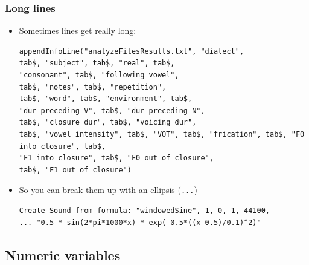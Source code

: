 \documentclass[handout]{beamer}
\begin{document}
\begin{frame}[fragile]
\frametitle{Long lines}
\begin{itemize}
    \item <1-> Sometimes lines get really long:
    \begin{verbatim}appendInfoLine("analyzeFilesResults.txt", "dialect",
tab$, "subject", tab$, "real", tab$,
"consonant", tab$, "following vowel",
tab$, "notes", tab$, "repetition",
tab$, "word", tab$, "environment", tab$,
"dur preceding V", tab$, "dur preceding N",
tab$, "closure dur", tab$, "voicing dur",
tab$, "vowel intensity", tab$, "VOT", tab$, "frication", tab$, "F0 into closure", tab$,
"F1 into closure", tab$, "F0 out of closure",
tab$, "F1 out of closure") 
    \end{verbatim}

    \item <2-> So you can break them up with an ellipsis (\texttt{...})
    \begin{verbatim}Create Sound from formula: "windowedSine", 1, 0, 1, 44100,
... "0.5 * sin(2*pi*1000*x) * exp(-0.5*((x-0.5)/0.1)^2)"
\end{verbatim}
\end{itemize}
\end{frame}

\subsection{Numeric variables}
\end{document}
